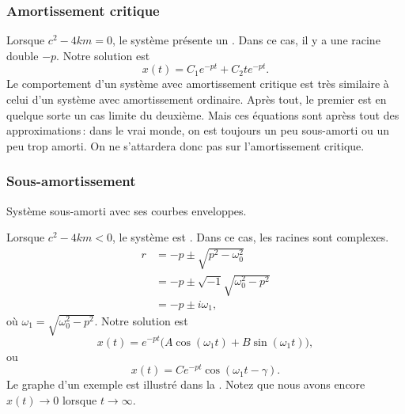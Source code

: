 \subsubsection{Amortissement critique}

Lorsque
$c^2 - 4km = 0$, le système présente un \emph{}.  Dans ce cas, il y a une racine double  $-p$.  Notre solution est 
\begin{equation*}
x(t) = C_1 e^{-pt} + C_2 t e^{-pt} .
\end{equation*}
Le comportement d'un système avec amortissement critique est très similaire à celui d'un système avec amortissement ordinaire. Après tout, le premier est en quelque sorte un cas limite du deuxième.  Mais ces équations sont aprèss tout des approximations\,: dans le vrai monde, on est toujours un peu sous-amorti ou un peu trop amorti. On ne s'attardera donc pas sur l'amortissement critique.

\subsubsection{Sous-amortissement}

\begin{mywrapfig}[13]{3.25in}
\capstart
{}
\caption{Système sous-amorti avec ses courbes enveloppes.\label{mv:underdampedfig}}
\end{mywrapfig}
%
%
Lorsque
$c^2 - 4km < 0$, le système est \emph{}.  Dans ce cas, les racines sont complexes. 
\begin{equation*}
\begin{split}
r & =
-p \pm \sqrt{p^2 - \omega_0^2} \\
& = 
-p \pm \sqrt{-1}\sqrt{\omega_0^2 - p^2} \\
& = 
-p \pm i \omega_1 ,
\end{split}
\end{equation*}
où $\omega_1 =\sqrt{\omega_0^2 - p^2}$.  Notre solution est
\begin{equation*}
x(t) = e^{-pt} \bigl( A \cos (\omega_1 t) + B \sin (\omega_1 t) \bigr) ,
\end{equation*}
ou
\begin{equation*}
x(t) = C e^{-pt} \cos ( \omega_1 t - \gamma ) .
\end{equation*}
Le graphe d'un exemple est illustré dans la  .  Notez que nous avons encore $x(t) \to 0$ lorsque $t \to \infty$.


